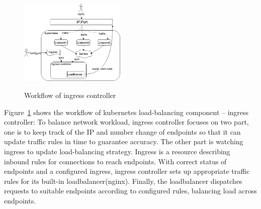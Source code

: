 \begin{figure}[htbp]
  \centering
  \includegraphics[width=0.45\textwidth]{images/ingress_controller.png}\\
  \caption{Workflow of ingress controller}
  \label{fig:ingress_controller}
\end{figure}
\hspace{0pt}

Figure~{\ref{fig:ingress_controller}} shows the workflow of kubernetes load-balancing component -- ingress controller: To balance network workload, ingress controller focuses on two part, one is to keep track of the IP and number change of endpoints so that it can update traffic rules in time to guarantee accuracy. The other part is watching ingress to update load-balancing strategy. Ingress is a resource describing inbound rules for connections to reach endpoints. With correct status of endpoints and a configured ingress, ingress controller sets up appropriate traffic rules for its built-in loadbalancer(nginx). Finally, the loadbalancer dispatches requests to suitable endpoints according to configured rules, balancing load across endpoints.



